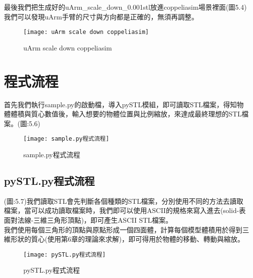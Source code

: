 最後我們把生成好的uArm\_scale\_down\_0.001stl放進coppeliasim場景裡面(圖5.4)我們可以發現uArm手臂的尺寸與方向都是正確的，無須再調整。\\

\begin{figure}[hbt!]
\begin{center}
\texttt{[image: uArm scale down coppeliasim]}
\caption{\Large uArm scale down coppeliasim}\label{uArm scale down coppeliasim}
\end{center}
\end{figure}

\section{程式流程}

首先我們執行sample.py的啟動檔，導入pySTL模組，即可讀取STL檔案，得知物體體積與質心數值後，輸入想要的物體位置與比例縮放，來達成最終理想的STL檔案。(圖:5.6)\\

\begin{figure}[hbt!]
\begin{center}
\texttt{[image: sample.py程式流程]}
\caption{\Large sample.py程式流程}\label{sample.py程式流程}
\end{center}
\end{figure}

\subsection{pySTL.py程式流程} 
(圖:5.7)我們讀取STL會先判斷各個種類的STL檔案，分別使用不同的方法去讀取檔案，當可以成功讀取檔案時，我們即可以使用ASCII的規格來寫入進去(solid-表面對法線-三維三角形頂點)，即可產生ASCII STL檔案。\\

    我們使用每個三角形的頂點與原點形成一個四面體，計算每個模型體積用於得到三維形狀的質心(使用第6章的理論來求解)，即可得用於物體的移動、轉動與縮放。\\

\begin{figure}[hbt!]
\begin{center}
\texttt{[image: pySTL.py程式流程]}
\caption{\Large pySTL.py程式流程}\label{pySTL.py程式流程}
\end{center}
\end{figure}


